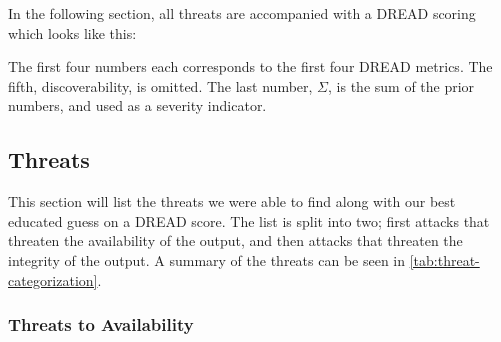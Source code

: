 In the following section, all threats are accompanied with a DREAD scoring which looks like this:
\vspace{\dimexpr-1\parsep-1\parskip\relax}%
\begin{center}
\end{center}
\vspace{\dimexpr-1\parsep-1\parskip\relax}%
The first four numbers each corresponds to the first four DREAD metrics. The fifth, discoverability, is omitted. The last number, $\Sigma$, is the sum of the prior numbers, and used as a severity indicator.

\subsection{Threats}
This section will list the threats we were able to find along with our best educated guess on a DREAD score. The list is split into two; first attacks that threaten the availability of the output, and then attacks that threaten the integrity of the output. A summary of the threats can be seen in \vref{tab:threat-categorization}.

\subsubsection{Threats to Availability}

\newcommand{\parathreat}[1]{\paragraph{#1}\hspace{-1ex}}


